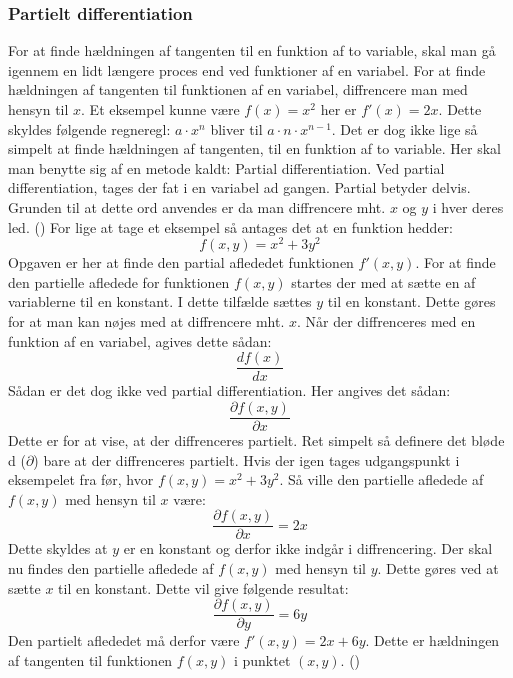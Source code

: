 
\subsubsection{Partielt differentiation}
For at finde hældningen af tangenten til en funktion af to variable, skal man gå igennem en lidt længere proces end ved funktioner af en variabel. For at finde hældningen af tangenten til funktionen af en variabel, diffrencere man med hensyn til $x$. Et eksempel kunne være $f(x) = x^2$ her er $f'(x) = 2x$. Dette skyldes følgende regneregl: $a \cdot x^n$ bliver til $a \cdot n \cdot x^{n-1}$. Det er dog ikke lige så simpelt at finde hældningen af tangenten, til en funktion af to variable. Her skal man benytte sig af en metode kaldt: Partial differentiation. Ved partial differentiation, tages der fat i en variabel ad gangen. Partial betyder delvis. Grunden til at dette ord anvendes er da man diffrencere mht. $x$ og $y$ i hver deres led. (\cite[4]{Larsen2016}) For lige at tage et eksempel så antages det at en funktion hedder: 
\begin{equation}f(x,y) = x^2 + 3y^2\end{equation}
Opgaven er her at finde den partial aflededet funktionen $f'(x,y)$. For at finde den partielle afledede for funktionen $f(x,y)$ startes der med at sætte en af variablerne til en konstant. I dette tilfælde sættes $y$ til en konstant. Dette gøres for at man kan nøjes med at diffrencere mht. $x$. Når der diffrenceres med en funktion af en variabel, agives dette sådan: \begin{equation}\frac{d f(x)}{d x}\end{equation} Sådan er det dog ikke ved partial differentiation. Her angives det sådan: \begin{equation}\frac{\partial f(x,y)}{\partial x}\end{equation} Dette er for at vise, at der diffrenceres partielt. Ret simpelt så definere det bløde d ($\partial$) bare at der diffrenceres partielt. Hvis der igen tages udgangspunkt i eksempelet fra før, hvor $f(x,y) = x^2 + 3y^2$. Så ville den partielle afledede af $f(x,y)$ med hensyn til $x$ være: \begin{equation}\frac{\partial f(x,y)}{\partial x} = 2x\end{equation}
Dette skyldes at $y$ er en konstant og derfor ikke indgår i diffrencering. Der skal nu findes den partielle afledede af $f(x,y)$ med hensyn til $y$. Dette gøres ved at sætte $x$ til en konstant. Dette vil give følgende resultat: \begin{equation}\frac{\partial f(x,y)}{\partial y} = 6y\end{equation} Den partielt aflededet må derfor være $f'(x,y) = 2x + 6y$. Dette er hældningen af tangenten til funktionen $f(x,y)$ i punktet $(x,y)$. (\cite[7-9]{ForberedelsessetMaj2013})

